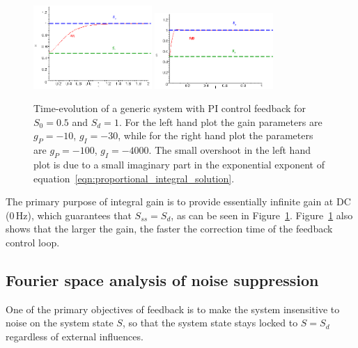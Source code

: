 \documentclass{article}
\begin{document}
\begin{figure}
\begin{center}
\includegraphics[width=0.4\textwidth]{pics/PI_from_05_to_1_settings1}
\includegraphics[width=0.4\textwidth]{pics/PI_from_05_to_1_settings2}
\end{center}
\caption{Time-evolution of a generic system with PI control feedback for $S_0 = 0.5$ and $S_d = 1$. For the left hand plot the gain parameters are $g_P = -10$, $g_I = -30$, while for the right hand plot the parameters are $g_P = -100$, $g_I = -4000$. The small overshoot in the left hand plot is due to a small imaginary part in the exponential exponent of equation~\ref{eqn:proportional_integral_solution}.}
\label{fig:PI_from_05_to_1}
\end{figure}

The primary purpose of integral gain is to provide essentially infinite gain at DC (0\,Hz), which guarantees that $S_{ss} = S_d$, as can be seen in Figure~\ref{fig:PI_from_05_to_1}. Figure~\ref{fig:PI_from_05_to_1} also shows that the larger the gain, the faster the correction time of the feedback control loop.

\subsection{Fourier space analysis of noise suppression}
One of the primary objectives of feedback is to make the system insensitive to noise on the system state $S$, so that the system state stays locked to $S = S_d$ regardless of external influences.
\end{document}
